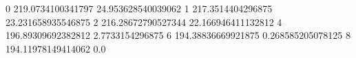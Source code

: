0 219.0734100341797 24.953628540039062
1 217.3514404296875 23.231658935546875
2 216.28672790527344 22.166946411132812
4 196.89309692382812 2.7733154296875
6 194.38836669921875 0.268585205078125
8 194.11978149414062 0.0
